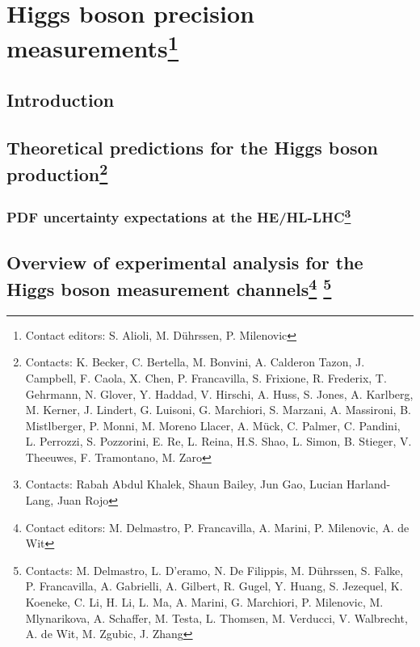\documentclass[../report.tex]{subfiles}
\providecommand{\main}{..}
\begin{document}
\section[Higgs boson precision measurements]{Higgs boson precision measurements\footnote{Contact editors: S. Alioli, M. D\"uhrssen, P. Milenovic}\label{sec2}}
\subsection{Introduction}
\label{sec2:introduction}


\subsection[Theoretical predictions for the Higgs boson production]{Theoretical predictions for the Higgs boson production\footnote{Contacts: K. Becker, C. Bertella, M. Bonvini, A. Calderon Tazon, J. Campbell, F. Caola, X. Chen,
P. Francavilla, S. Frixione, R. Frederix, T. Gehrmann, N. Glover, Y. Haddad, V. Hirschi, A. Huss, S. Jones, 
A. Karlberg, M. Kerner, J. Lindert, G. Luisoni, G. Marchiori, S. Marzani, A. Massironi, B. Mistlberger,
P. Monni, M. Moreno Llacer, A. M\"uck, C. Palmer, C. Pandini, L. Perrozzi, S. Pozzorini, E. Re, L. Reina,
H.S. Shao, L. Simon, B. Stieger, V. Theeuwes, F. Tramontano, M. Zaro}
}
\label{sec2_HXSWG1}


\subsubsection[PDF uncertainty expectations at the HE/HL-LHC]{PDF uncertainty expectations at the HE/HL-LHC\footnote{Contacts: Rabah Abdul Khalek, Shaun Bailey, Jun Gao, Lucian Harland-Lang,  Juan Rojo}}
\label{sec2:PDFuncertainties}


\subsection[Overview of experimental analysis for the Higgs boson measurement channels]{Overview of experimental analysis for the Higgs boson measurement channels\footnote{Contact editors: M. Delmastro, P. Francavilla, A. Marini, P. Milenovic, A. de Wit}
\footnote{Contacts: M. Delmastro, L. D'eramo, N. De Filippis, M. D\"uhrssen, S. Falke, P. Francavilla, A. Gabrielli, A. Gilbert, R. Gugel, Y. Huang, S. Jezequel, K. Koeneke, C. Li, H. Li, L. Ma, A. Marini, G. Marchiori, P. Milenovic, M. Mlynarikova, A. Schaffer, M. Testa, L. Thomsen, M. Verducci, V. Walbrecht, A. de Wit, M. Zgubic, J. Zhang}}
\label{sec2:expan}
\label{sec2:channels}

\end{document}
